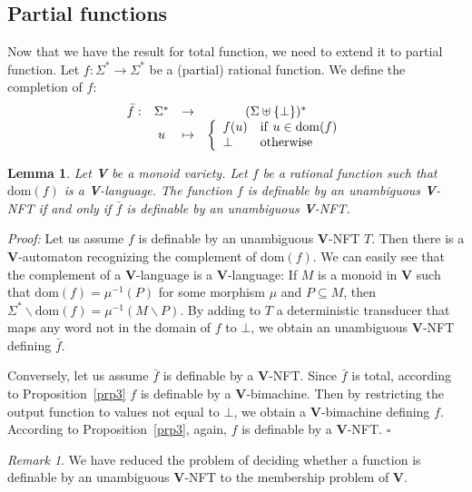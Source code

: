 \documentclass[12pt]{report}
\newtheorem{lem}{Lemma}[section]
\theoremstyle{definition}
\theoremstyle{remark}
\newtheorem{rmk}{Remark}[section]
\newenvironment{prf}
{\textit{Proof:}}
{\hfill $\square$\\}
\begin{document}
\subsection{Partial functions}

Now that we have the result for total function, we need to extend it to partial function.
Let $f:\Sigma^\ast\rightarrow \Sigma^\ast$ be a (partial) rational function.
We define the completion of $f$:
$$\begin{array}{cccc}\bar f:& \Sigma^\ast &\rightarrow & (\Sigma\uplus\left\{\bot \right\})^\ast \\
&u & \mapsto & \left\{\begin{array}{l l} f(u) & \mathrm{if} \ u\in \mathrm{dom}(f) \\ \bot & \mathrm{otherwise}\end{array}  \right.
\end{array} $$

\begin{lem}
\label{lem_comp}
Let \textbf V be a monoid variety.
Let $f$ be a rational function such that $\mathrm{dom}(f)$ is a \textbf V-language.
The function $f$ is definable by an unambiguous \textbf V-NFT if and only if $\bar f$ is definable by an unambiguous \textbf V-NFT.
\end{lem}

\begin{prf}
Let us assume $f$ is definable by an unambiguous \textbf V-NFT $T$.
Then there is a \textbf V-automaton recognizing the complement of $\mathrm{dom}(f)$.
We can easily see that the complement of a \textbf V-language is a \textbf V-language: If $M$ is a monoid in \textbf V such that $\mathrm{dom}(f)=\mu^{-1}(P)$ for some morphism $\mu$ and $P\subseteq M$, then $\Sigma^\ast\backslash \mathrm{dom}(f)=\mu^{-1}(M\backslash P)$.
By adding to $T$ a deterministic transducer that maps any word not in the domain of $f$ to $\bot$, we obtain an unambiguous \textbf V-NFT defining $\bar f$.

Conversely, let us assume $\bar f$ is definable by a \textbf V-NFT. Since $\bar f$ is total, according to Proposition~\ref{prp3} $f$ is definable by a \textbf V-bimachine. Then by restricting the output function to values not equal to $\bot$, we obtain a \textbf V-bimachine defining $f$. According to Proposition~\ref{prp3}, again, $f$ is definable by a \textbf V-NFT.
\end{prf}

\begin{rmk}
We have reduced the problem of deciding whether a function is definable by an unambiguous \textbf V-NFT to the membership problem of \textbf V.
\end{rmk}
\end{document}
